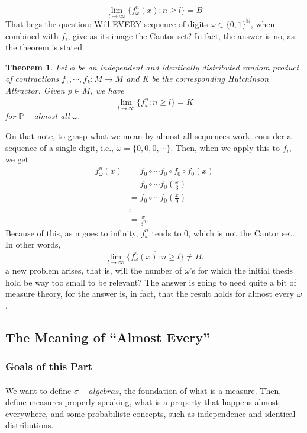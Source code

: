 \documentclass[a4paper]{article}
\theoremstyle{plain}
\newtheorem{theorem}{Theorem}[section] %
\theoremstyle{definition}
\begin{document}
   $$ 
   \lim_{l\to\infty}\overline{\{f_{\omega}^{n}(x):n\geq{l}\}} = B 
   $$ 
   That begs the question: Will EVERY sequence of digits $\omega\in\{0, 1\}^{\mathbb{N}}$, when combined with $f_{i}$, give  
 as its image the Cantor set? In fact, the answer is no, as the theorem is stated 
  \begin{theorem}
    Let $\phi$ be an independent and identically distributed random product of contractions $f_{1},\cdots, f_{k}:M\rightarrow M$ and 
   K be the corresponding Hutchinson Attractor. Given $p\in M$, we have 
     $$ 
     \lim_{l\to\infty}\overline{\{f_{\omega}^{n}:n\geq{l}\}} = K 
     $$ 
     for $\mathbb{P}-$almost all $\omega.$ 
  \end{theorem} 
 On that note, to grasp what we mean by almost all sequences work, consider a sequence of a single digit, i.e., $\omega =\{0, 0, 0, \cdots\} $. Then, when we apply this to $f_{i}$, we get 
   \begin{align*} 
     f_{\omega}^{n}(x) &= f_{0}\circ{\cdots}f_{0}\circ{f_{0}}\circ{f_{0}}(x)\\ 
                       &= f_{0}\circ{\cdots}f_{0}(\frac{x}{3}) \\ 
                       &= f_{0}\circ{\cdots}f_{0}(\frac{x}{9}) \\ 
                       &\vdots\\ 
                       &= \frac{x}{3^{n}}. 
   \end{align*} 
   Because of this, as n goes to infinity, $f_{\omega}^{n}$ tends to 0, which is not the Cantor set. In other words, 
   $$ 
     \lim_{l\to\infty}\overline{\{f_{\omega}^{n}(x):n\geq{l}\}}\neq B. 
   $$ 
   a new problem arises, that is, will the number of $\omega$'s for which the initial thesis hold be way too small to be relevant? The answer is going to need 
 quite a bit of measure theory, for the answer is, in fact, that the result holds for almost every $\omega$. 
  
 \subsection{The Meaning of ``Almost Every''} 
   \subsubsection{Goals of this Part} 
   \paragraph{} We want to define $\sigma-algebras$, the foundation of what is a measure. Then, define measures properly speaking, what is a property that 
 happens almost everywhere, and some probabilistc concepts, such as independence and identical distributions. 
\end{document}
